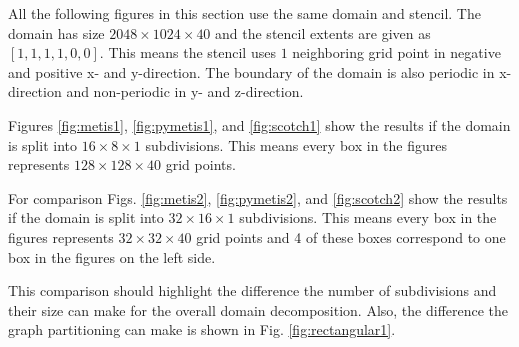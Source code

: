 All the following figures in this section use the same domain and stencil.
The domain has size $2048 \times 1024 \times 40$ and the stencil extents are given as $\left[1, 1, 1, 1, 0, 0\right]$.
This means the stencil uses $1$ neighboring grid point in negative and positive x- and y-direction.
The boundary of the domain is also periodic in x-direction and non-periodic in y- and z-direction.

Figures \ref{fig:metis1}, \ref{fig:pymetis1}, and \ref{fig:scotch1} show the results if the domain is split into $16 \times 8 \times 1$ subdivisions.
This means every box in the figures represents $128 \times 128 \times 40$ grid points.

For comparison Figs. \ref{fig:metis2}, \ref{fig:pymetis2}, and \ref{fig:scotch2} show the results if the domain is split into $32 \times 16 \times 1$ subdivisions.
This means every box in the figures represents $32 \times 32 \times 40$ grid points and 4 of these boxes correspond to one box in the figures on the left side.

This comparison should highlight the difference the number of subdivisions and their size can make for the overall domain decomposition.
Also, the difference the graph partitioning can make is shown in Fig. \ref{fig:rectangular1}.


